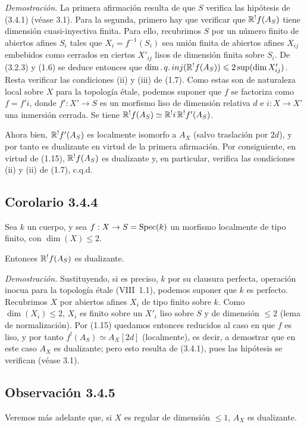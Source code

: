 \emph{Demostración.} La primera afirmación resulta de que $S$ verifica las hipótesis de (3.4.1) (véase 3.1). Para la segunda, primero hay que verificar que $\mathbb{R}^{!}f(A_S)$ tiene dimensión cuasi-inyectiva finita. Para ello, recubrimos $S$ por un número finito de abiertos afines $S_i$ tales que $X_i = f^{-1}(S_i)$ sea unión finita de abiertos afines $X_{ij}$ embebidos como cerrados en ciertos $X'_{ij}$ lisos de dimensión finita sobre $S_i$. De (3.2.3) y (1.6) se deduce entonces que $\dim.\,q.\,inj(\mathbb{R}^{!}f(A_S)) \leqslant 2\sup(\dim X'_{ij})$. Resta verificar las condiciones (ii) y (iii) de (1.7). Como estas son de naturaleza local sobre $X$ para la topología étale, podemos suponer que $f$ se factoriza como $f = f'i$, donde $f' : X' \to S$ es un morfismo liso de dimensión relativa $d$ e $i : X \to X'$ una inmersión cerrada. Se tiene $\mathbb{R}^{!}f(A_S) \simeq \mathbb{R}^{!}i \, \mathbb{R}^{!}f'(A_S)$.

Ahora bien, $\mathbb{R}^{!}f'(A_S)$ es localmente isomorfo a $A_X$ (salvo traslación por $2d$), y por tanto es dualizante en virtud de la primera afirmación. Por consiguiente, en virtud de (1.15), $\mathbb{R}^{!}f(A_S)$ es dualizante y, en particular, verifica las condiciones (ii) y (ii) de (1.7), c.q.d.

\subsection*{Corolario 3.4.4}
Sea $k$ un cuerpo, y sea $f : X \to S = \operatorname{Spec}(k)$ un morfismo localmente de tipo finito, con $\dim(X) \leqslant 2$.

Entonces $\mathbb{R}^{!}f(A_S)$ es dualizante.

\emph{Demostración.} Sustituyendo, si es preciso, $k$ por su clausura perfecta, operación inocua para la topología étale (VIII~1.1), podemos suponer que $k$ es perfecto. Recubrimos $X$ por abiertos afines $X_i$ de tipo finito sobre $k$. Como $\dim(X_i) \leqslant 2$, $X_i$ es finito sobre un $X'_i$ liso sobre $S$ y de dimensión $\leqslant 2$ (lema de normalización). Por (1.15) quedamos entonces reducidos al caso en que $f$ es liso, y por tanto $f^{!}(A_S) \simeq A_X[2d]$ (localmente), es decir, a demostrar que en este caso $A_X$ es dualizante; pero esto resulta de (3.4.1), pues las hipótesis se verifican (véase 3.1).

\subsection*{Observación 3.4.5}
Veremos más adelante que, si $X$ es regular de dimensión $\leqslant 1$, $A_X$ es dualizante.
